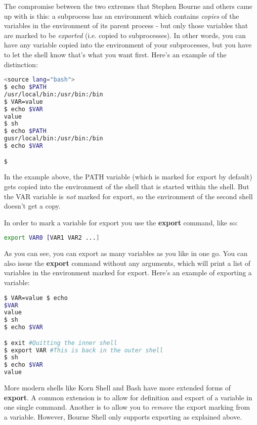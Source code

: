 The compromise between the two extremes that Stephen Bourne and others came up
with is this: a subprocess has an environment which contains \textit{copies} of
the variables in the environment of its parent process - but only those
variables that are marked to be \textit{exported} (i.e. copied to
subprocesses). In other words, you can have any variable copied into the
environment of your subprocesses, but you have to let the shell know that's
what you want first. Here's an example of the distinction:
\lstset{basicstyle=\scriptsize, numbers=left, captionpos=b, tabsize=4}
\begin{lstlisting}[caption=Exported and non-exported variables,language={bash},
xleftmargin=15pt,label=lst:Exported and non-exported variables]
<source lang="bash">
$ echo $PATH
/usr/local/bin:/usr/bin:/bin
$ VAR=value
$ echo $VAR
value
$ sh
$ echo $PATH
gusr/local/bin:/usr/bin:/bin
$ echo $VAR

$
\end{lstlisting}

In the example above, the PATH variable (which is marked for export by default)
gets copied into the environment of the shell that is started within the shell.
But the VAR variable is \textit{not} marked for export, so the environment of
the second shell doesn't get a copy.

In order to mark a variable for export you use the \textbf{export} command,
like so:
\lstset{basicstyle=\scriptsize, numbers=left, captionpos=b, tabsize=4}
\begin{lstlisting}[language={bash},
xleftmargin=15pt]
export VAR0 [VAR1 VAR2 ...]
\end{lstlisting}

As you can see, you can export as many variables as you like in one go. You can
also issue the \textbf{export} command without any arguments, which will print
a list of variables in the environment marked for export. Here's an example of
exporting a variable:
\lstset{basicstyle=\scriptsize, numbers=left, captionpos=b, tabsize=4}
\begin{lstlisting}[caption=Exporting a variable,language={bash},
xleftmargin=15pt,label=lst:Exporting a variable]
$ VAR=value $ echo
$VAR
value
$ sh
$ echo $VAR

$ exit #Quitting the inner shell
$ export VAR #This is back in the outer shell
$ sh
$ echo $VAR
value
\end{lstlisting}

More modern shells like Korn Shell and Bash have more extended forms of
\textbf{export}. A common extension is to allow for definition and export of a
variable in one single command. Another is to allow you to \textit{remove} the
export marking from a variable. However, Bourne Shell only supports exporting
as explained above.

